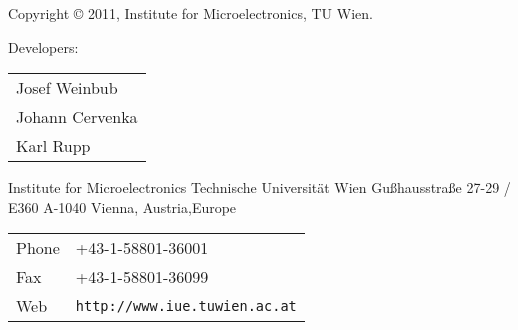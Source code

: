 
\clearpage

Copyright {\copyright} 2011, Institute for Microelectronics, TU Wien.

\vspace{4.0cm}

Developers:\\ 

\begin{tabular}{l}
Josef Weinbub\\
Johann Cervenka\\
Karl Rupp
\end{tabular}

\vspace{4.0cm}

Institute for Microelectronics\newline
Technische Universit\"at Wien\newline
Gu\ss hausstra\ss e 27-29 / E360\newline
A-1040 Vienna, Austria,Europe\newline

\begin{tabular}{ll}
Phone  & +43-1-58801-36001\\
Fax    & +43-1-58801-36099\\
Web    & \texttt{http://www.iue.tuwien.ac.at}
\end{tabular}



